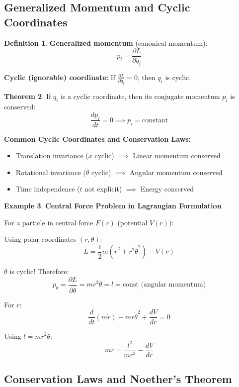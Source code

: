 \documentclass[12pt,a4paper]{article}
\theoremstyle{definition}
\newtheorem{theorem}{Theorem}[section]
\newtheorem{definition}[theorem]{Definition}
\newtheorem{example}[theorem]{Example}
\begin{document}
\subsection{Generalized Momentum and Cyclic Coordinates}

\begin{definition}
\textbf{Generalized momentum} (canonical momentum):
\[
p_i = \frac{\partial L}{\partial \dot{q}_i}
\]

\textbf{Cyclic (ignorable) coordinate:} If $\frac{\partial L}{\partial q_i} = 0$, then $q_i$ is cyclic.
\end{definition}

\begin{theorem}
If $q_i$ is a cyclic coordinate, then its conjugate momentum $p_i$ is conserved:
\[
\frac{dp_i}{dt} = 0 \implies p_i = \text{constant}
\]
\end{theorem}

\begin{importantbox}
\textbf{Common Cyclic Coordinates and Conservation Laws:}
\begin{itemize}
    \item Translation invariance ($x$ cyclic) $\implies$ Linear momentum conserved
    \item Rotational invariance ($\theta$ cyclic) $\implies$ Angular momentum conserved
    \item Time independence ($t$ not explicit) $\implies$ Energy conserved
\end{itemize}
\end{importantbox}

\begin{example}
\textbf{Central Force Problem in Lagrangian Formulation}

For a particle in central force $F(r)$ (potential $V(r)$):

Using polar coordinates $(r, \theta)$:
\[
L = \frac{1}{2}m(\dot{r}^2 + r^2\dot{\theta}^2) - V(r)
\]

$\theta$ is cyclic! Therefore:
\[
p_\theta = \frac{\partial L}{\partial \dot{\theta}} = mr^2\dot{\theta} = l = \text{const (angular momentum)}
\]

For $r$:
\[
\frac{d}{dt}(m\dot{r}) - mr\dot{\theta}^2 + \frac{dV}{dr} = 0
\]

Using $l = mr^2\dot{\theta}$:
\[
m\ddot{r} = \frac{l^2}{mr^3} - \frac{dV}{dr}
\]
\end{example}

\subsection{Conservation Laws and Noether's Theorem}
\end{document}
